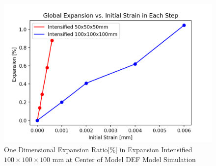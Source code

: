 \begin{figure}[ht!]
\centering
\includegraphics[width=.8\linewidth]{Files/exp_plot/DEFA30X0vsX-1_exp.png}
\caption{One Dimensional Expansion Ratio[\%] in Expansion Intensified $100 \times 100 \times 100$ mm at Center of Model DEF Model Simulation}
\label{fig:DEFA30X0vsX-1_exssp}
\end{figure}
